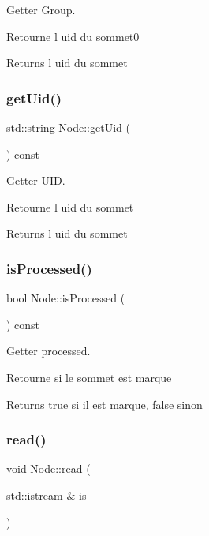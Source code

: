 Getter Group. 

Retourne l uid du sommet0

\begin{DoxyReturn}{Returns}
l uid du sommet 
\end{DoxyReturn}
\mbox{\label{class_node_a53a0fb412c1047a27e07e7e4c5749bee}} 
\subsubsection{\texorpdfstring{get\+Uid()}{getUid()}}
{\footnotesize\ttfamily std\+::string Node\+::get\+Uid (\begin{DoxyParamCaption}{ }\end{DoxyParamCaption}) const}



Getter U\+ID. 

Retourne l uid du sommet

\begin{DoxyReturn}{Returns}
l uid du sommet 
\end{DoxyReturn}
\mbox{\label{class_node_a1fa00bc88d4a66614ee06c913dbda27f}} 
\subsubsection{\texorpdfstring{is\+Processed()}{isProcessed()}}
{\footnotesize\ttfamily bool Node\+::is\+Processed (\begin{DoxyParamCaption}{ }\end{DoxyParamCaption}) const}



Getter processed. 

Retourne si le sommet est marque

\begin{DoxyReturn}{Returns}
true si il est marque, false sinon 
\end{DoxyReturn}
\mbox{\label{class_node_ac59311eb42715f4a1f04a225618cace8}} 
\subsubsection{\texorpdfstring{read()}{read()}}
{\footnotesize\ttfamily void Node\+::read (\begin{DoxyParamCaption}\item[{std\+::istream \&}]{is }\end{DoxyParamCaption})}



